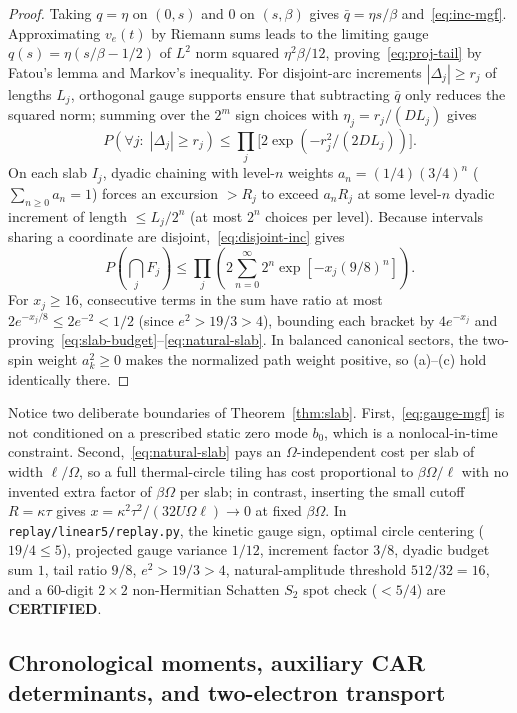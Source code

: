 \documentclass[11pt]{article}
\theoremstyle{remark}
\newcommand{\certified}{\textbf{CERTIFIED}}
\begin{document}
\begin{proof}
Taking $q=\eta$ on $(0,s)$ and $0$ on $(s,\beta)$ gives $\bar q=\eta s/\beta$ and~\eqref{eq:inc-mgf}. Approximating $v_e(t)$ by Riemann sums leads to the limiting gauge $q(s)=\eta(s/\beta-1/2)$ of $L^2$ norm squared $\eta^2\beta/12$, proving~\eqref{eq:proj-tail} by Fatou's lemma and Markov's inequality. For disjoint-arc increments $|\Delta_j|\ge r_j$ of lengths $L_j$, orthogonal gauge supports ensure that subtracting $\bar q$ only reduces the squared norm; summing over the $2^m$ sign choices with $\eta_j=r_j/(DL_j)$ gives
\begin{equation}\label{eq:disjoint-inc}
 P(\forall j:\;|\Delta_j|\ge r_j)\le \prod_j \bigl[2\exp(-r_j^2/(2DL_j))\bigr].
\end{equation}
On each slab $I_j$, dyadic chaining with level-$n$ weights $a_n=(1/4)(3/4)^n$ ($\sum_{n\ge 0}a_n=1$) forces an excursion $>R_j$ to exceed $a_n R_j$ at some level-$n$ dyadic increment of length $\le L_j/2^n$ (at most $2^n$ choices per level). Because intervals sharing a coordinate are disjoint,~\eqref{eq:disjoint-inc} gives
\[
 P\!\left(\bigcap_j F_j\right)\le \prod_j \left(2\sum_{n=0}^\infty 2^n \exp\!\left[-x_j (9/8)^n\right]\right).
\]
For $x_j\ge 16$, consecutive terms in the sum have ratio at most $2e^{-x_j/8}\le 2e^{-2}<1/2$ (since $e^2>19/3>4$), bounding each bracket by $4e^{-x_j}$ and proving~\eqref{eq:slab-budget}--\eqref{eq:natural-slab}. In balanced canonical sectors, the two-spin weight $a_k^2\ge 0$ makes the normalized path weight positive, so (a)--(c) hold identically there.
\end{proof}

Notice two deliberate boundaries of Theorem~\ref{thm:slab}. First,~\eqref{eq:gauge-mgf} is not conditioned on a prescribed static zero mode $b_0$, which is a nonlocal-in-time constraint. Second,~\eqref{eq:natural-slab} pays an $\Omega$-independent cost per slab of width $\ell/\Omega$, so a full thermal-circle tiling has cost proportional to $\beta\Omega/\ell$ with no invented extra factor of $\beta\Omega$ per slab; in contrast, inserting the small cutoff $R=\kappa\tau$ gives $x=\kappa^2\tau^2/(32U\Omega\ell)\to 0$ at fixed $\beta\Omega$. In \texttt{replay/linear5/replay.py}, the kinetic gauge sign, optimal circle centering ($19/4\le 5$), projected gauge variance $1/12$, increment factor $3/8$, dyadic budget sum $1$, tail ratio $9/8$, $e^2>19/3>4$, natural-amplitude threshold $512/32=16$, and a $60$-digit $2\times 2$ non-Hermitian Schatten $S_2$ spot check ($<5/4$) are \certified{}.

\subsection{Chronological moments, auxiliary CAR determinants, and two-electron transport}
\end{document}
